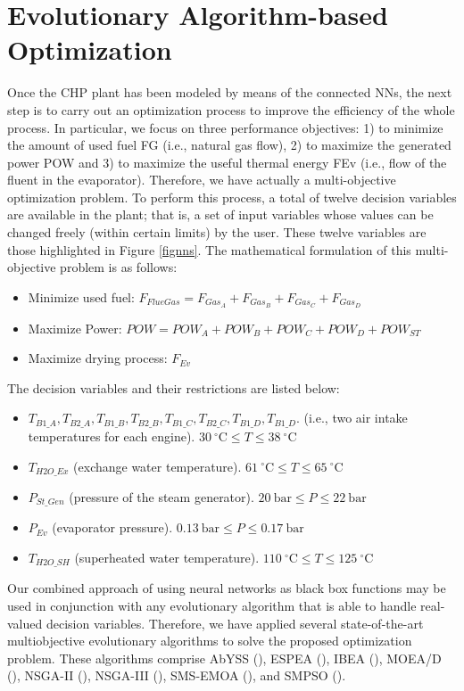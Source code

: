\section{Evolutionary Algorithm-based Optimization}
\label{sec:optimization}
Once the CHP plant has been modeled by means of the connected NNs, the next step is to  carry out an optimization process to improve the efficiency of the whole process. In particular, we focus on three performance objectives: 1) to minimize the amount of used fuel FG (i.e., natural gas flow), 2) to maximize the generated power POW and 3) to maximize the useful thermal energy FEv (i.e., flow of the fluent in the evaporator). Therefore, we have actually a multi-objective optimization problem. To perform this process, a total of twelve decision variables  are available in the plant; that is, a set of input variables whose values can be changed freely (within certain limits) by the user. These twelve variables are those highlighted in  Figure  \ref{fignns}. The mathematical formulation of this multi-objective problem is as follows:
%
\begin{itemize}[-]
	\item Minimize used fuel:		$F_{FlueGas} = F_{Gas_A} + F_{Gas_B} + F_{Gas_C} + F_{Gas_D}$
	\item Maximize Power:		$POW = POW_A + POW_B + POW_C + POW_D + POW_{ST}$
	\item Maximize drying process: 	$F_{Ev}$
\end{itemize}
%
The decision variables and their restrictions are listed below:
%
\begin{itemize}[-]
	\item $T_{B1\_A}, T_{B2\_A}, T_{B1\_B}, T_{B2\_B}, T_{B1\_C}, T_{B2\_C}, T_{B1\_D}, T_{B1\_D}$. (i.e., two air intake temperatures for each engine). $30~^{\circ}\textrm{C} \leq T  \leq  38~^{\circ}\textrm{C}$
	\item $T_{H2O\_Ex}$ (exchange water temperature). $61~^{\circ}\textrm{C}  \leq T  \leq  65~^{\circ}\textrm{C}$
	\item $P_{St\_Gen}$ (pressure of the steam generator). $20~\textrm{bar}  \leq  P  \leq  22~\textrm{bar}$
	\item $P_{Ev}$ (evaporator pressure). $0.13~\textrm{bar}  \leq  P  \leq  0.17~\textrm{bar}$
	\item $T_{H2O\_SH}$ (superheated water temperature). $110~^{\circ}\textrm{C}  \leq  T  \leq  125~^{\circ}\textrm{C}$
\end{itemize}

Our combined approach of using neural networks as black box functions may be used in conjunction with any evolutionary algorithm that is able to handle real-valued decision variables. Therefore, we have applied several state-of-the-art multiobjective evolutionary algorithms to solve the proposed optimization problem. These algorithms comprise AbYSS (\cite{abyss}), ESPEA (\cite{espea}), IBEA (\cite{ibea}), MOEA/D (\cite{moead2009}), NSGA-II (\cite{nsga2}), NSGA-III (\cite{nsga3part1}), SMS-EMOA (\cite{smsemoa}), and SMPSO (\cite{smpso}).

